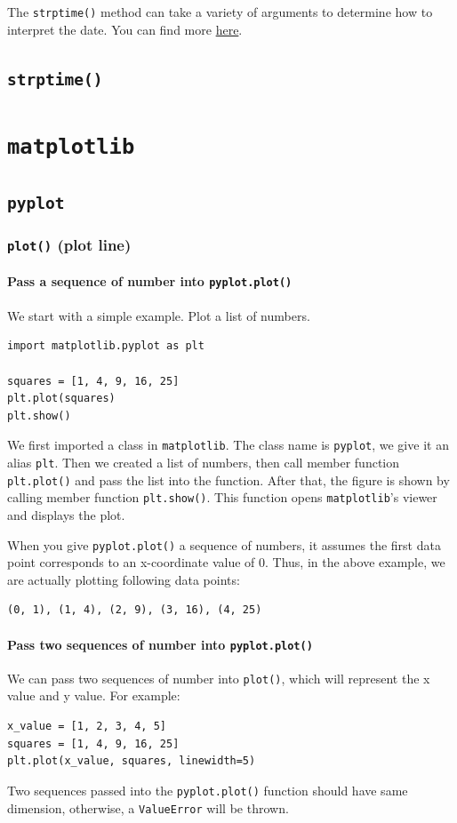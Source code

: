 \documentclass[12pt]{book}
\begin{document}
The \texttt{strptime()} method can take a variety of arguments to determine how to interpret the date. You can find more \href{https://docs.python.org/3/library/datetime.html\#strftime-and-strptime-behavior}{here}.

\section{\texttt{strptime()}}
\label{sec:org69d6ca2}

\chapter{\texttt{matplotlib}}
\label{sec:org9f65065}
\section{\texttt{pyplot}}
\label{sec:orgbe1d32c}
\subsection{\texttt{plot()} (plot line)}
\label{sec:orgf6df4bb}
\subsubsection{Pass a sequence of number into \texttt{pyplot.plot()}}
\label{sec:orgeb64b24}
We start with a simple example. Plot a list of numbers.
\begin{verbatim}
import matplotlib.pyplot as plt

squares = [1, 4, 9, 16, 25]
plt.plot(squares)
plt.show()
\end{verbatim}
We first imported a class in \texttt{matplotlib}. The class name is \texttt{pyplot}, we give it an alias \texttt{plt}. Then we created a list of numbers, then call member function \texttt{plt.plot()} and pass the list into the function. After that, the figure is shown by calling member function \texttt{plt.show()}. This function opens \texttt{matplotlib}'s viewer and displays the plot.

When you give \texttt{pyplot.plot()} a sequence of numbers, it assumes the first data point corresponds to an x-coordinate value of 0. Thus, in the above example, we are actually plotting following data points:
\begin{verbatim}
(0, 1), (1, 4), (2, 9), (3, 16), (4, 25)
\end{verbatim}
\subsubsection{Pass two sequences of number into \texttt{pyplot.plot()}}
\label{sec:orgf9cfe0c}
We can pass two sequences of number into \texttt{plot()}, which will represent the x value and y value. For example:
\begin{verbatim}
x_value = [1, 2, 3, 4, 5]
squares = [1, 4, 9, 16, 25]
plt.plot(x_value, squares, linewidth=5)
\end{verbatim}
Two sequences passed into the \texttt{pyplot.plot()} function should have same dimension, otherwise, a \texttt{ValueError} will be thrown.
\end{document}
